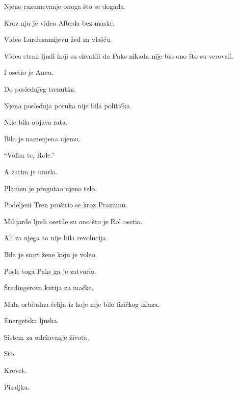Njeno razumevanje onoga što se događa.

\bigskip

Kroz nju je video Albeda bez maske.

Video Lurdusamijevu žeđ za vlašću.

Video strah ljudi koji su shvatili da Paks nikada nije bio ono što su verovali.

\bigskip

I osetio je Aneu.

\bigskip

Do poslednjeg trenutka.

\bigskip

Njena poslednja poruka nije bila politička.

\bigskip

Nije bila objava rata.

\bigskip

Bila je namenjena njemu.

\bigskip

``Volim te, Role.''

\bigskip

A zatim je umrla.

\bigskip

Plamen je progutao njeno telo.

\bigskip

Podeljeni Tren proširio se kroz Prazninu.

\bigskip

Milijarde ljudi osetile su ono što je Rol osetio.

\bigskip

Ali za njega to nije bila revolucija.

\bigskip

Bila je smrt žene koju je voleo.

\bigskip

Posle toga Paks ga je zatvorio.

\bigskip

Šredingerova kutija za mačke.

\bigskip

Mala orbitalna ćelija iz koje nije bilo fizičkog izlaza.

\bigskip

Energetska ljuska.

Sistem za održavanje života.

Sto.

Krevet.

Pisaljka.

\bigskip

